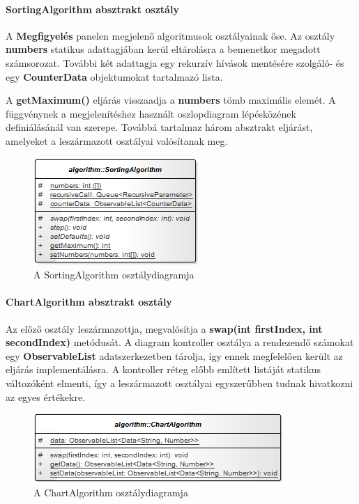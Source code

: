 \documentclass{elteikthesis}
\begin{document}
\paragraph{SortingAlgorithm absztrakt osztály}
A \textbf{Megfigyelés} panelen megjelenő algoritmusok osztályainak őse. Az osztály \textbf{numbers} statikus adattagjában kerül eltárolásra a bemenetkor megadott számsorozat. További két adattagja egy rekurzív hívások mentésére szolgáló- és egy \textbf{CounterData} objektumokat tartalmazó lista.\par
A \textbf{getMaximum()} eljárás visszaadja a \textbf{numbers} tömb maximális elemét. A függvénynek a megjelenítéshez használt oszlopdiagram lépésközének definiálásánál van szerepe. Továbbá tartalmaz három absztrakt eljárást, amelyeket a leszármazott osztályai valósítanak meg.
\begin{figure}[H]
	\centering
	\includegraphics{pics/class/SortingAlgorithm.png}
	\caption{A SortingAlgorithm osztálydiagramja}
\end{figure}
\paragraph{ChartAlgorithm absztrakt osztály}
Az előző osztály leszármazottja, megvalósítja a \textbf{swap(int firstIndex, int secondIndex)} metódusát. A diagram kontroller osztálya a rendezendő számokat egy \textbf{ObservableList} adatszerkezetben tárolja, így ennek megfelelően került az eljárás implementálásra. A kontroller réteg előbb említett listáját statikus változóként elmenti, így a leszármazott osztályai egyszerűbben tudnak hivatkozni az egyes értékekre.
\begin{figure}[H]
	\centering
	\includegraphics{pics/class/ChartAlgorithm.png}
	\caption{A ChartAlgorithm osztálydiagramja}
\end{figure}
\end{document}
